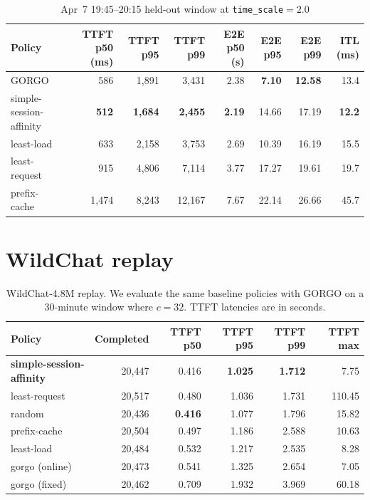 \documentclass{article}
\begin{document}
\begin{table}[h]
\centering
\small
\setlength{\tabcolsep}{2.7pt}
\caption{Apr~7 19:45--20:15 held-out window at \texttt{time\_scale}${=}2.0$}
\label{tab:apr7_ts2}
\begin{tabular}{lrrrrrrr}
\toprule
Policy & TTFT p50 (ms) & TTFT p95 & TTFT p99 & E2E p50 (s) & E2E p95 & E2E p99 & ITL (ms) \\
\midrule
GORGO                   & 586          & 1{,}891          & 3{,}431          & 2.38          & \textbf{7.10}  & \textbf{12.58} & 13.4 \\
simple-session-affinity & \textbf{512} & \textbf{1{,}684} & \textbf{2{,}455} & \textbf{2.19} & 14.66          & 17.19          & \textbf{12.2} \\
least-load              & 633          & 2{,}158          & 3{,}753          & 2.69          & 10.39          & 16.19          & 15.5 \\
least-request           & 915          & 4{,}806          & 7{,}114          & 3.77          & 17.27          & 19.61          & 19.7 \\
prefix-cache            & 1{,}474      & 8{,}243          & 12{,}167         & 7.67          & 22.14          & 26.66          & 45.7 \\
\bottomrule
\end{tabular}
\end{table}

\section{WildChat replay}
\label{app:wildchat}

\begin{table}[h]
\centering
\small
\caption{WildChat-4.8M replay. We evaluate the same baseline policies with GORGO on a 30-minute window where $c{=}32$. TTFT latencies are in seconds.
}
\label{tab:wildchat}
\begin{tabular}{lrrrrr}
\toprule
Policy & Completed & TTFT p50 & TTFT p95 & TTFT p99 & TTFT max \\
\midrule
\textbf{simple-session-affinity} & 20{,}447 & 0.416 & \textbf{1.025} & \textbf{1.712} & 7.75    \\
least-request                    & 20{,}517 & 0.480 & 1.036          & 1.731          & 110.45  \\
random                           & 20{,}436 & \textbf{0.416} & 1.077 & 1.796          & 15.82   \\
prefix-cache                     & 20{,}504 & 0.497 & 1.186          & 2.588          & 10.63   \\
least-load                       & 20{,}484 & 0.532 & 1.217          & 2.535          & 8.28    \\
gorgo (online)                   & 20{,}473 & 0.541 & 1.325          & 2.654          & 7.05    \\
gorgo (fixed)                    & 20{,}462 & 0.709 & 1.932          & 3.969          & 60.18   \\
\bottomrule
\end{tabular}
\end{table}
\end{document}
